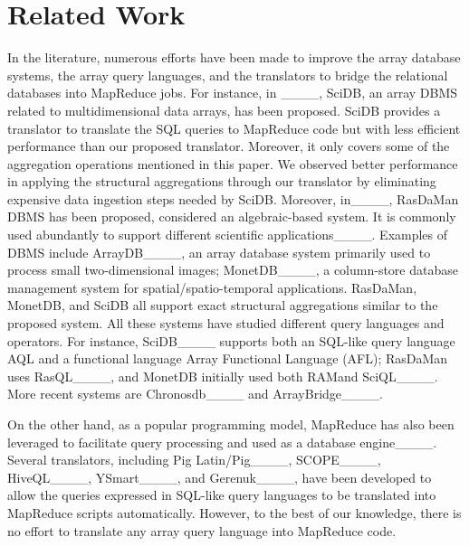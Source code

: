 \section{Related Work}
\label{related}

In the literature, numerous efforts have been made to improve the array database systems, the array query languages, and the translators to bridge the relational databases into MapReduce jobs. For instance, in ____, SciDB, an array DBMS related to multidimensional data arrays, has been proposed. SciDB provides a translator to translate the SQL queries to MapReduce code but with less efficient performance than our proposed translator. Moreover, it only covers some of the aggregation operations mentioned in this paper. We observed better performance in applying the structural aggregations through our translator by eliminating expensive data ingestion steps needed by SciDB.
Moreover, in____, RasDaMan DBMS has been proposed, considered an algebraic-based system. It is commonly used abundantly to support different scientific applications____. Examples of DBMS include ArrayDB____, an array database system primarily used to process small two-dimensional images; MonetDB____, a column-store database management system for spatial/spatio-temporal applications. RasDaMan, MonetDB, and SciDB all support exact structural aggregations similar to the proposed system. All these systems have studied different query languages and operators. For instance, SciDB____ supports both an SQL-like query language AQL and a functional language Array Functional Language (AFL); RasDaMan uses RasQL____, and MonetDB initially used both RAMand SciQL____. More recent systems are Chronosdb____ and ArrayBridge____.

On the other hand, as a popular programming model, MapReduce has also been leveraged to facilitate query processing and used as a database engine____. Several translators, including Pig Latin/Pig____, SCOPE____, HiveQL____, YSmart____, and Gerenuk____, have been developed to allow the queries expressed in SQL-like query languages to be translated into MapReduce scripts automatically. However, to the best of our knowledge, there is no effort to translate any array query language into MapReduce code.